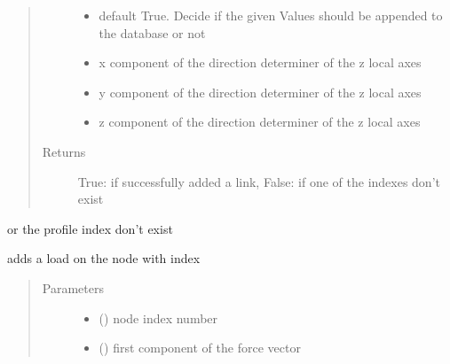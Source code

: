 \documentclass[letterpaper,10pt,english]{sphinxmanual}
\begin{document}
\begin{fulllineitems}
\begin{fulllineitems}
\begin{quote}
\begin{description}
\begin{itemize}
\item {} 
 \textendash{} default True. Decide if the given Values should be appended to the database or not

\item {} 
 \textendash{} x component of the direction determiner of the z local axes

\item {} 
 \textendash{} y component of the direction determiner of the z local axes

\item {} 
 \textendash{} z component of the direction determiner of the z local axes

\end{itemize}

\item[{Returns}] \leavevmode
True: if successfully added a link, False: if one of the indexes don’t exist

\end{description}\end{quote}

or the profile index don’t exist

\end{fulllineitems}


\begin{fulllineitems}
\label{\detokenize{api:beamon.database.Database.add_load}}
adds a load on the node with index
\begin{quote}\begin{description}
\item[{Parameters}] \leavevmode\begin{itemize}
\item {} 
 () \textendash{} node index number

\item {} 
 () \textendash{} first component of the force vector


\end{itemize}
\end{description}
\end{quote}
\end{fulllineitems}
\end{fulllineitems}
\end{document}
